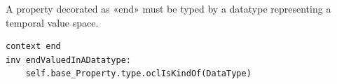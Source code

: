 \begin{constraint}
\label{endValuedInADatatype}
A property decorated as «end» must be typed by a datatype representing a temporal value space.
 
\begin{lstlisting}[language=OCL]
context end
inv endValuedInADatatype:
    self.base_Property.type.oclIsKindOf(DataType)
\end{lstlisting}
\end{constraint}

